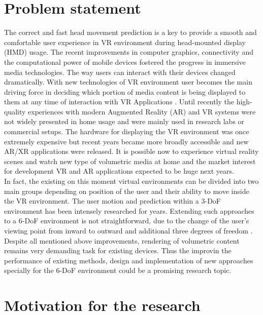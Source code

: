 \section{Problem statement}
\label{sec:intro:problem}
The correct and fast head movement prediction is a key to provide a smooth and comfortable user experience in VR environment during head-mounted display (HMD) usage. The recent improvements in computer graphics, connectivity and the computational power of mobile devices fostered the progress in immersive media technologies. The way users can interact with their devices changed dramatically. With new technologies of VR environment user becomes the main driving force in deciding which portion of media content is being displayed to them at any time of interaction with VR Applications \cite{new_challenge}. Until recently the high-quality experiences with modern Augmented Reality (AR) and VR systems were not widely presented in home usage and were mainly used in research labs or commercial setups. The hardware for displaying the VR environment was once extremely expensive but recent years became more broadly accessible and new AR/XR applications were released. It is possible now to experience virtual reality scenes and watch new type of volumetric media at home and the market interest for development VR and AR applications expected to be huge next years.\\
In fact, the existing on this moment virtual environments can be divided into two main groups depending on position of the user and their ability to move inside the VR environment. The user motion and prediction within a 3-DoF environment has been intensely researched for years. Extending such approaches to a 6-DoF environment is not straightforward, due to the change of the user's viewing point from inward to outward and additional three degrees of freedom \cite{6-dof_metrics}.\\
Despite all mentioned above improvements, rendering of volumetric content remains very demanding task for existing devices. Thus the improvin the performance of existing methods, design and implementation of new approaches specially for the 6-DoF environment could be a promising research topic.

\section{Motivation for the research}
\label{sec:intro:motivation}

